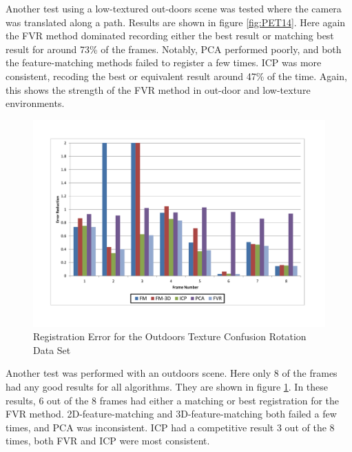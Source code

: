 Another test using a low-textured out-doors scene was tested where the camera was translated along a path. Results are shown in figure \ref{fig:PET14}. Here again the FVR method dominated recording either the best result or matching best result for around 73\% of the frames. Notably, PCA performed poorly, and both the feature-matching methods failed to register a few times. ICP was more consistent, recoding the best or equivalent result around 47\% of the time. Again, this shows the strength of the FVR method in out-door and low-texture environments. 

\begin{figure}[t]
\centering
\includegraphics[width=6.0in]{images/results/Outside_TextureConfusion_Rotation}
\caption{Registration Error for the Outdoors Texture Confusion Rotation Data Set}
\label{fig:PET15}
\end{figure}

Another test was performed with an outdoors scene. Here only 8 of the frames had any good results for all algorithms. They are shown in figure \ref{fig:PET15}. In these results, 6 out of the 8 frames had either a matching or best registration for the FVR method. 2D-feature-matching and 3D-feature-matching both failed a few times, and PCA was inconsistent. ICP had a competitive result 3 out of the 8 times, both FVR and ICP were most consistent. 

